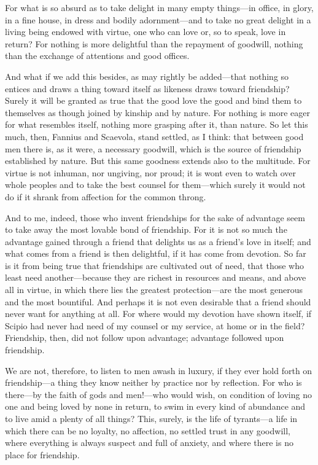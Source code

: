  For what is so absurd as to take delight in many empty things—in office, in glory, in a fine house, in dress and bodily adornment—and to take no great delight in a living being endowed with virtue, one who can love or, so to speak, love in return? For nothing is more delightful than the repayment of goodwill, nothing than the exchange of attentions and good offices.

 And what if we add this besides, as may rightly be added—that nothing so entices and draws a thing toward itself as likeness draws toward friendship? Surely it will be granted as true that the good love the good and bind them to themselves as though joined by kinship and by nature. For nothing is more eager for what resembles itself, nothing more grasping after it, than nature. So let this much, then, Fannius and Scaevola, stand settled, as I think: that between good men there is, as it were, a necessary goodwill, which is the source of friendship established by nature. But this same goodness extends also to the multitude. For virtue is not inhuman, nor ungiving, nor proud; it is wont even to watch over whole peoples and to take the best counsel for them—which surely it would not do if it shrank from affection for the common throng.

 And to me, indeed, those who invent friendships for the sake of advantage seem to take away the most lovable bond of friendship. For it is not so much the advantage gained through a friend that delights us as a friend's love in itself; and what comes from a friend is then delightful, if it has come from devotion. So far is it from being true that friendships are cultivated out of need, that those who least need another—because they are richest in resources and means, and above all in virtue, in which there lies the greatest protection—are the most generous and the most bountiful. And perhaps it is not even desirable that a friend should never want for anything at all. For where would my devotion have shown itself, if Scipio had never had need of my counsel or my service, at home or in the field? Friendship, then, did not follow upon advantage; advantage followed upon friendship.

 We are not, therefore, to listen to men awash in luxury, if they ever hold forth on friendship—a thing they know neither by practice nor by reflection. For who is there—by the faith of gods and men!—who would wish, on condition of loving no one and being loved by none in return, to swim in every kind of abundance and to live amid a plenty of all things? This, surely, is the life of tyrants—a life in which there can be no loyalty, no affection, no settled trust in any goodwill, where everything is always suspect and full of anxiety, and where there is no place for friendship.

